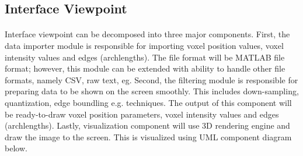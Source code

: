 
\subsection{Interface Viewpoint}
\paragraph{}
\normalsize

	Interface viewpoint can be decomposed into three major components. First, the data importer module is responsible for importing voxel position values, voxel intensity values and edges (archlengths). The file format will be MATLAB file format; however, this module can be extended with ability to handle other file formats, namely CSV, raw text, eg. Second, the filtering module is responsible for preparing data to be shown on the screen smoothly. This includes down-sampling, quantization, edge boundling e.g. techniques. The output of this component will be ready-to-draw voxel position parameters, voxel intensity values and edges (archlengths). Lastly, visualization component will use 3D rendering engine and draw the image to the screen. This is visualized using UML component diagram below.\\
    



